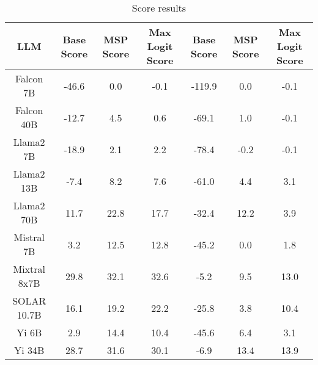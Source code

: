 \renewcommand\arraystretch{1.2}
\begin{table*}
\centering
\begin{tabular}{c|c|c|c|c|c|c}
LLM & Base Score & MSP Score & Max Logit Score & Base Score & MSP Score & Max Logit Score\\ \hline
Falcon 7B & -46.6 & 0.0 & -0.1 & -119.9 & 0.0 & -0.1\\
Falcon 40B & -12.7 & 4.5 & 0.6 & -69.1 & 1.0 & -0.1\\
Llama2 7B & -18.9 & 2.1 & 2.2 & -78.4 & -0.2 & -0.1\\
Llama2 13B & -7.4 & 8.2 & 7.6 & -61.0 & 4.4 & 3.1\\
Llama2 70B & 11.7 & 22.8 & 17.7 & -32.4 & 12.2 & 3.9\\
Mistral 7B & 3.2 & 12.5 & 12.8 & -45.2 & 0.0 & 1.8\\
Mixtral 8x7B & 29.8 & 32.1 & 32.6 & -5.2 & 9.5 & 13.0\\
SOLAR 10.7B & 16.1 & 19.2 & 22.2 & -25.8 & 3.8 & 10.4\\
Yi 6B & 2.9 & 14.4 & 10.4 & -45.6 & 6.4 & 3.1\\
Yi 34B & 28.7 & 31.6 & 30.1 & -6.9 & 13.4 & 13.9\\
\hline
\end{tabular}
\caption{Score results}
\end{table*}
\label{tab:score}
